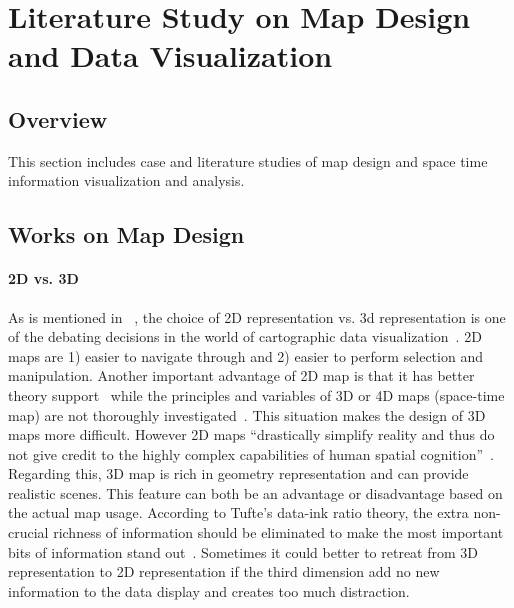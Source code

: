 
\chapter{Literature Study on Map Design and Data
  Visualization} %

\label{Chapter5} %


\section{Overview}
This section includes case and literature studies of map design and
space time information visualization and analysis.

\section{Works on Map Design}\label{mapDesign}

\subsubsection{2D vs. 3D} \label{2d3d} 

As is mentioned in ~\cite{Brownrigg2005}, the choice of 2D
representation vs. 3d representation is one of the debating decisions
in the world of cartographic data
visualization~\cite{Brownrigg2005}. 2D maps are 1) easier to navigate
through and 2) easier to perform selection and manipulation. Another
important advantage of 2D map is that it has better theory
support~\cite{Resch2014} while the principles and variables of 3D or
4D maps (space-time map) are not thoroughly
investigated~\cite{Resch2014}. This situation makes the design of 3D
maps more difficult. However 2D maps ``drastically simplify reality
and thus do not give credit to the highly complex capabilities of
human spatial cognition''~\cite{Resch2014}. Regarding this, 3D map is
rich in geometry representation and can provide realistic scenes. This
feature can both be an advantage or disadvantage based on the actual
map usage. According to Tufte's data-ink ratio theory, the extra
non-crucial richness of information should be eliminated to make the
most important bits of information stand out~\cite{Tufte83}. Sometimes
it could better to retreat from 3D representation to 2D representation
if the third dimension add no new information to the data display and
creates too much distraction.


